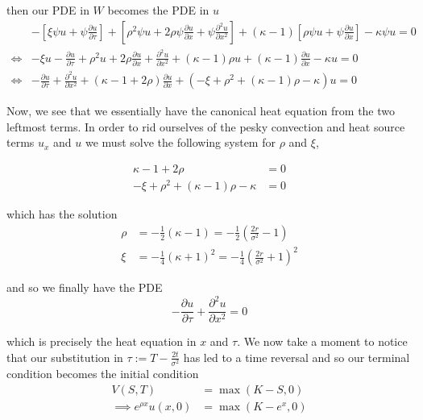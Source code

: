 \documentclass[12pt]{article}
\newlength\tindent
\renewcommand{\indent}{\hspace*{\tindent}}
\begin{document}
then our PDE in $W$ becomes the PDE in $u$
\begin{align*}
	& -\left[ \xi \psi u + \psi \frac{\partial u}{\partial \tau} \right] + \left[ \rho^2 \psi u + 2\rho \psi \frac{\partial u}{\partial x} + \psi \frac{\partial^2 u}{\partial x^2} \right] + \left( \kappa - 1 \right) \left[ \rho \psi u + \psi \frac{\partial u}{\partial x} \right] - \kappa \psi u = 0 \\
	\iff&  - \xi u -\frac{\partial u}{\partial \tau} + \rho^2 u + 2\rho \frac{\partial u}{\partial x} + \frac{\partial^2 u}{\partial x^2} + \left( \kappa - 1 \right) \rho u + (\kappa - 1) \frac{\partial u}{\partial x} - \kappa u = 0 \\
	\iff&  -\frac{\partial u}{\partial \tau} + \frac{\partial^2 u}{\partial x^2} + (\kappa - 1 + 2\rho) \frac{\partial u}{\partial x} + ( -\xi + \rho^2 + (\kappa - 1)\rho - \kappa) u = 0
\end{align*}

\indent Now, we see that we essentially have the canonical heat equation from the two leftmost terms. In order to rid ourselves of the pesky convection and heat source terms $u_x$ and $u$ we must solve the following system for $\rho$ and $\xi$,

\begin{align*}
	\kappa - 1 + 2\rho &= 0 \\
	-\xi + \rho^2 + (\kappa - 1)\rho - \kappa &= 0
\end{align*}

which has the solution
\begin{align*}
	\rho &= -\frac{1}{2} (\kappa - 1) = -\frac{1}{2} \left( \frac{2r}{\sigma^2} - 1 \right) \\
	\xi &= -\frac{1}{4} (\kappa + 1)^2 = -\frac{1}{4} \left( \frac{2r}{\sigma^2} + 1 \right)^2
\end{align*}

and so we finally have the PDE
\begin{equation*}
	-\frac{\partial u}{\partial \tau} + \frac{\partial^2 u}{\partial x^2} = 0
\end{equation*}

which is precisely the heat equation in $x$ and $\tau$. We now take a moment to notice that our substitution in $\tau:= T - \frac{2t}{\sigma^2}$ has led to a time reversal and so our terminal condition becomes the initial condition
\begin{align*}
	V(S, T) &= \max (K - S, 0) \\
	\implies e^{\rho x} u(x, 0) &= \max (K - e^x, 0)
\end{align*}
\end{document}
